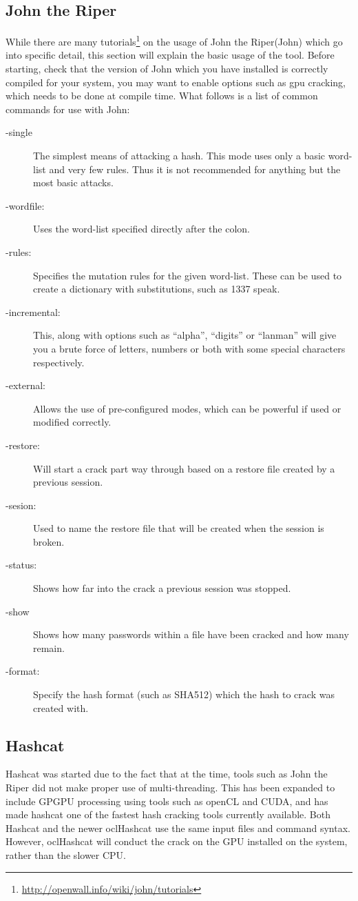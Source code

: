 \documentclass[a4paper,11pt]{report}
\begin{document}
		\subsection{John the Riper}
			While there are many tutorials\footnote{\url{http://openwall.info/wiki/john/tutorials}} on the usage of John the Riper(John) which go into specific detail, this section will explain the basic usage of the tool. 
			Before starting, check that the version of John which you have installed is correctly compiled for your system, you may want to enable options such as gpu cracking, which needs to be done at compile time. 
			What follows is a list of common commands for use with John:
			\begin{description}
				\item[-single]
					The simplest means of attacking a hash. 
					This mode uses only a basic word-list and very few rules. 
					Thus it is not recommended for anything but the most basic attacks. 
				\item[-wordfile:]
					Uses the word-list specified directly after the colon. 
				\item[-rules:]
					Specifies the mutation rules for the given word-list. 
					These can be used to create a dictionary with substitutions, such as 1337 speak. 
				\item[-incremental:]
					This, along with options such as ``alpha'', ``digits'' or ``lanman'' will give you a brute force of letters, numbers or both with some special characters respectively. 
				\item[-external:]
					Allows the use of pre-configured modes, which can be powerful if used or modified correctly. 
				\item[-restore:]
					Will start a crack part way through based on a restore file created by a previous session. 
				\item[-sesion:]
					Used to name the restore file that will be created when the session is broken. 
				\item[-status:]
					Shows how far into the crack a previous session was stopped. 
				\item[-show]
					Shows how many passwords within a file have been cracked and how many remain. 
				\item[-format:]
					Specify the hash format (such as SHA512) which the hash to crack was created with. 
			\end{description}
			
		\subsection{Hashcat}
			Hashcat was started due to the fact that at the time, tools such as John the Riper did not make proper use of multi-threading. 
			This has been expanded to include GPGPU processing using tools such as openCL and CUDA, and has made hashcat one of the fastest hash cracking tools currently available. 
			Both Hashcat and the newer oclHashcat use the same input files and command syntax. 
			However, oclHashcat will conduct the crack on the GPU installed on the system, rather than the slower CPU. 
\end{document}
